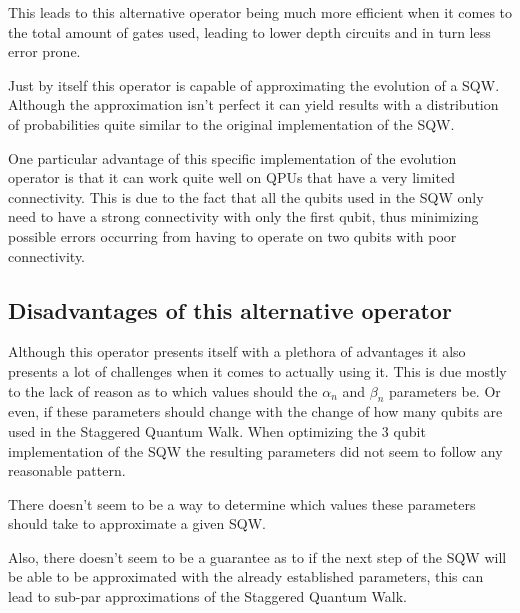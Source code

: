 This leads to this alternative operator being much more efficient when it comes to the total amount of gates used, leading to lower depth circuits and in turn less error prone.



Just by itself this operator is capable of approximating the evolution of a SQW. Although the approximation isn't perfect it can yield results with a distribution of probabilities quite similar to the original implementation of the SQW.


One particular advantage of this specific implementation of the evolution operator is that it can work quite well on QPUs that have a very limited connectivity. This is due to the fact that all the qubits used in the SQW only need to have a strong connectivity with only the first qubit, thus minimizing possible errors occurring from having to operate on two qubits with poor connectivity.

\subsection{Disadvantages of this alternative operator}

Although this operator presents itself with a plethora of advantages it also presents a lot of challenges when it comes to actually using it. This is due mostly to the lack of reason as to which values should the $\alpha_n$ and $\beta_n$ parameters be. Or even, if these parameters should change with the change of how many qubits are used in the Staggered Quantum Walk. When optimizing the 3 qubit implementation of the SQW the resulting parameters did not seem to follow any reasonable pattern. 

There doesn't seem to be a way to determine which values these parameters should take to approximate a given SQW.

Also, there doesn't seem to be a guarantee as to if the next step of the SQW will be able to be approximated with the already established parameters, this can lead to sub-par approximations of the Staggered Quantum Walk.











